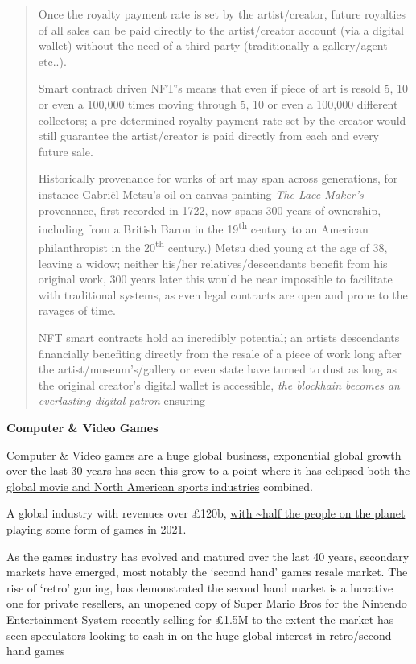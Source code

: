 \begin{quote}
Once the royalty payment rate is set by the artist/creator, future
royalties of all sales can be paid directly to the artist/creator
account (via a digital wallet) without the need of a third party
(traditionally a gallery/agent etc..).

Smart contract driven NFT's means that even if piece of art is resold 5,
10 or even a 100,000 times moving through 5, 10 or even a 100,000
different collectors; a pre-determined royalty payment rate set by the
creator would still guarantee the artist/creator is paid directly from
each and every future sale.

Historically provenance for works of art may span across generations,
for instance Gabriël Metsu's oil on canvas painting \emph{The Lace
Maker's} provenance, first recorded in 1722, now spans 300 years of
ownership, including from a British Baron in the 19\textsuperscript{th}
century to an American philanthropist in the 20\textsuperscript{th}
century.) Metsu died young at the age of 38, leaving a widow; neither
his/her relatives/descendants benefit from his original work, 300 years
later this would be near impossible to facilitate with traditional
systems, as even legal contracts are open and prone to the ravages of
time.

NFT smart contracts hold an incredibly potential; an artists descendants
financially benefiting directly from the resale of a piece of work long
after the artist/museum's/gallery or even state have turned to dust as
long as the original creator's digital wallet is accessible, \emph{the
blockhain becomes an everlasting digital patron} ensuring
\end{quote}

\textbf{Computer \& Video Games}

Computer \& Video games are a huge global business, exponential global
growth over the last 30 years has seen this grow to a point where it has
eclipsed both the
\href{https://www.businessinsider.com/video-game-industry-revenues-exceed-sports-and-film-combined-idc-2020-12?r=US\&IR=T}{global
movie and North American sports industries} combined.

A global industry with revenues over £120b,
\href{https://www.wepc.com/news/video-game-statistics/}{with
\textasciitilde half the people on the planet} playing some form of
games in 2021.

As the games industry has evolved and matured over the last 40 years,
secondary markets have emerged, most notably the `second hand' games
resale market. The rise of `retro' gaming, has demonstrated the second
hand market is a lucrative one for private resellers, an unopened copy
of Super Mario Bros for the Nintendo Entertainment System
\href{https://www.nytimes.com/2021/08/06/business/super-mario-bros-sale-record.html}{recently
selling for £1.5M} to the extent the market has seen
\href{https://www.businessinsider.com/retro-gaming-market-being-overtaken-by-speculators-2021-9?r=US\&IR=T}{speculators
looking to cash in} on the huge global interest in retro/second hand
games

